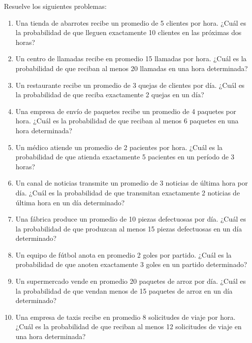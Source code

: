 \begin{Ejer}
Resuelve los siguientes problemas:

\begin{enumerate}
    \item Una tienda de abarrotes recibe un promedio de 5 clientes por hora. ¿Cuál es la probabilidad de que lleguen exactamente 10 clientes en las próximas dos horas?

    \item Un centro de llamadas recibe en promedio 15 llamadas por hora. ¿Cuál es la probabilidad de que reciban al menos 20 llamadas en una hora determinada?

    \item Un restaurante recibe un promedio de 3 quejas de clientes por día. ¿Cuál es la probabilidad de que reciba exactamente 2 quejas en un día?

    \item Una empresa de envío de paquetes recibe un promedio de 4 paquetes por hora. ¿Cuál es la probabilidad de que reciban al menos 6 paquetes en una hora determinada?

    \item Un médico atiende un promedio de 2 pacientes por hora. ¿Cuál es la probabilidad de que atienda exactamente 5 pacientes en un período de 3 horas?

    \item Un canal de noticias transmite un promedio de 3 noticias de última hora por día. ¿Cuál es la probabilidad de que transmitan exactamente 2 noticias de última hora en un día determinado?

    \item Una fábrica produce un promedio de 10 piezas defectuosas por día. ¿Cuál es la probabilidad de que produzcan al menos 15 piezas defectuosas en un día determinado?

    \item Un equipo de fútbol anota en promedio 2 goles por partido. ¿Cuál es la probabilidad de que anoten exactamente 3 goles en un partido determinado?

    \item Un supermercado vende en promedio 20 paquetes de arroz por día. ¿Cuál es la probabilidad de que vendan menos de 15 paquetes de arroz en un día determinado? 

    \item Una empresa de taxis recibe en promedio 8 solicitudes de viaje por hora. ¿Cuál es la probabilidad de que reciban al menos 12 solicitudes de viaje en una hora determinada? 
\end{enumerate}
\end{Ejer}



